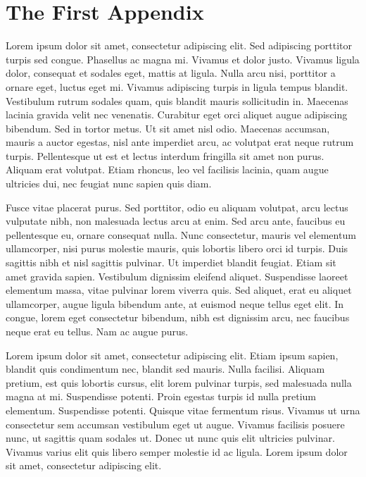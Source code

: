 \chapter{The First Appendix}

Lorem ipsum dolor sit amet, consectetur adipiscing elit. Sed adipiscing porttitor turpis sed congue. Phasellus ac magna mi. Vivamus et dolor justo. Vivamus ligula dolor, consequat et sodales eget, mattis at ligula. Nulla arcu nisi, porttitor a ornare eget, luctus eget mi. Vivamus adipiscing turpis in ligula tempus blandit. Vestibulum rutrum sodales quam, quis blandit mauris sollicitudin in. Maecenas lacinia gravida velit nec venenatis. Curabitur eget orci aliquet augue adipiscing bibendum. Sed in tortor metus. Ut sit amet nisl odio. Maecenas accumsan, mauris a auctor egestas, nisl ante imperdiet arcu, ac volutpat erat neque rutrum turpis. Pellentesque ut est et lectus interdum fringilla sit amet non purus. Aliquam erat volutpat. Etiam rhoncus, leo vel facilisis lacinia, quam augue ultricies dui, nec feugiat nunc sapien quis diam.

Fusce vitae placerat purus. Sed porttitor, odio eu aliquam volutpat, arcu lectus vulputate nibh, non malesuada lectus arcu at enim. Sed arcu ante, faucibus eu pellentesque eu, ornare consequat nulla. Nunc consectetur, mauris vel elementum ullamcorper, nisi purus molestie mauris, quis lobortis libero orci id turpis. Duis sagittis nibh et nisl sagittis pulvinar. Ut imperdiet blandit feugiat. Etiam sit amet gravida sapien. Vestibulum dignissim eleifend aliquet. Suspendisse laoreet elementum massa, vitae pulvinar lorem viverra quis. Sed aliquet, erat eu aliquet ullamcorper, augue ligula bibendum ante, at euismod neque tellus eget elit. In congue, lorem eget consectetur bibendum, nibh est dignissim arcu, nec faucibus neque erat eu tellus. Nam ac augue purus.

Lorem ipsum dolor sit amet, consectetur adipiscing elit. Etiam ipsum sapien, blandit quis condimentum nec, blandit sed mauris. Nulla facilisi. Aliquam pretium, est quis lobortis cursus, elit lorem pulvinar turpis, sed malesuada nulla magna at mi. Suspendisse potenti. Proin egestas turpis id nulla pretium elementum. Suspendisse potenti. Quisque vitae fermentum risus. Vivamus ut urna consectetur sem accumsan vestibulum eget ut augue. Vivamus facilisis posuere nunc, ut sagittis quam sodales ut. Donec ut nunc quis elit ultricies pulvinar. Vivamus varius elit quis libero semper molestie id ac ligula. Lorem ipsum dolor sit amet, consectetur adipiscing elit.

